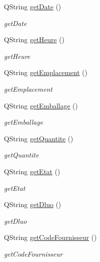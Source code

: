 \begin{DoxyCompactItemize}
Q\+String \mbox{\hyperlink{class_produits_a66bdd66bb570daecc6b5b0401c8eb774}{get\+Date}} ()
\begin{DoxyCompactList}\small\item\em get\+Date \end{DoxyCompactList}\item 
Q\+String \mbox{\hyperlink{class_produits_af33acfbd18f5066923255b746beff1a6}{get\+Heure}} ()
\begin{DoxyCompactList}\small\item\em get\+Heure \end{DoxyCompactList}\item 
Q\+String \mbox{\hyperlink{class_produits_a7ac80d42336ae2c0ff848546f5a7234b}{get\+Emplacement}} ()
\begin{DoxyCompactList}\small\item\em get\+Emplacement \end{DoxyCompactList}\item 
Q\+String \mbox{\hyperlink{class_produits_a1f45334c187daa76f7cc89e89165f7d8}{get\+Emballage}} ()
\begin{DoxyCompactList}\small\item\em get\+Emballage \end{DoxyCompactList}\item 
Q\+String \mbox{\hyperlink{class_produits_a6bd3be10a39c03cc092befda9b8bc28e}{get\+Quantite}} ()
\begin{DoxyCompactList}\small\item\em get\+Quantite \end{DoxyCompactList}\item 
Q\+String \mbox{\hyperlink{class_produits_a999d2dabebf4ad5c3e61a9333b7f78fa}{get\+Etat}} ()
\begin{DoxyCompactList}\small\item\em get\+Etat \end{DoxyCompactList}\item 
Q\+String \mbox{\hyperlink{class_produits_a7eeb9647a3fcf2a21e0d15da7fb5910c}{get\+Dluo}} ()
\begin{DoxyCompactList}\small\item\em get\+Dluo \end{DoxyCompactList}\item 
Q\+String \mbox{\hyperlink{class_produits_a4e9998c0b687c784dd94b070f91040fd}{get\+Code\+Fournisseur}} ()
\begin{DoxyCompactList}\small\item\em get\+Code\+Fournisseur \end{DoxyCompactList}\end{DoxyCompactItemize}


